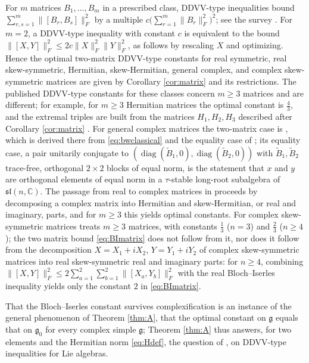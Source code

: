 \documentclass[leqno,10pt]{amsart}
\theoremstyle{definition}
\numberwithin{equation}{section}
\newcommand{\sll}{\mathfrak{sl}}
\newcommand{\g}{\mathfrak{g}}
\newcommand{\com}{\mathbb C}
\newcommand{\gz}{\g_{0}}
\newcommand{\fnorm}[1]{\lVert #1\rVert_{F}}
\begin{document}
For $m$ matrices $B_{1}, \dots, B_{m}$ in a prescribed class, DDVV-type inequalities bound $\sum_{r, s = 1}^{m}\fnorm{[B_{r}, B_{s}]}^{2}$ by a multiple $c\big(\sum_{r=1}^{m}\fnorm{B_{r}}^{2}\big)^{2}$; see the survey \cite{Ge-Li-Tang-Zhou-survey}. For $m = 2$, a DDVV-type inequality with constant $c$ is equivalent to the bound $\fnorm{[X, Y]}^{2} \leq 2c\fnorm{X}^{2}\fnorm{Y}^{2}$, as follows by rescaling $X$ and optimizing. Hence the optimal two-matrix DDVV-type constants for real symmetric, real skew-symmetric, Hermitian, skew-Hermitian, general complex, and complex skew-symmetric matrices are given by Corollary \ref{cor:matrix} and its restrictions. The published DDVV-type constants for these classes \cite{Ge, Ge-Xu-You-Zhou, Ge-Li-Zhou} concern $m \geq 3$ matrices and are different; for example, for $m \geq 3$ Hermitian matrices the optimal constant is $\tfrac{4}{3}$, and the extremal triples are built from the matrices $H_{1}, H_{2}, H_{3}$ described after Corollary \ref{cor:matrix} \cite[Theorem 1.1]{Ge-Xu-You-Zhou}. For general complex matrices the two-matrix case is \cite[Theorem 2.3(2)]{Ge-Li-Zhou}, which is derived there from \eqref{eq:bwclassical} and the equality case of \cite{Cheng-Vong-Wenzel}; its equality case, a pair unitarily conjugate to $(\operatorname{diag}(\tilde{B}_{1}, 0), \operatorname{diag}(\tilde{B}_{2}, 0))$ with $\tilde{B}_{1}, \tilde{B}_{2}$ trace-free, orthogonal $2 \times 2$ blocks of equal norm, is the statement that $x$ and $y$ are orthogonal elements of equal norm in a $\tau$-stable long-root subalgebra of $\sll(n, \com)$. The passage from real to complex matrices in \cite{Ge-Li-Zhou} proceeds by decomposing a complex matrix into Hermitian and skew-Hermitian, or real and imaginary, parts, and for $m \geq 3$ this yields optimal constants. For complex skew-symmetric matrices \cite[Corollary 2.6]{Ge-Li-Zhou} treats $m \geq 3$ matrices, with constants $\tfrac{1}{3}$ ($n = 3$) and $\tfrac{2}{3}$ ($n \geq 4$); the two matrix bound \eqref{eq:BImatrix} does not follow from it, nor does it follow from the decomposition $X = X_{1} + iX_{2}$, $Y = Y_{1} + iY_{2}$ of complex skew-symmetric matrices into real skew-symmetric real and imaginary parts: for $n \geq 4$, combining $\fnorm{[X, Y]}^{2} \leq 2\sum_{a=1}^{2}\sum_{b=1}^{2}\fnorm{[X_{a}, Y_{b}]}^{2}$ with the real Bloch--Iserles inequality yields only the constant $2$ in \eqref{eq:BImatrix}. 

That the Bloch--Iserles constant survives complexification is an instance of the general phenomenon of Theorem \ref{thm:A}, that the optimal constant on $\g$ equals that on $\gz$ for every complex simple $\g$; Theorem \ref{thm:A} thus answers, for two elements and the Hermitian norm \eqref{eq:Hdef}, the question of \cite[Section 1, question (2)]{Ge-Li-Zhou}, \cite[Question 4.2]{Ge-Li-Tang-Zhou-survey} on DDVV-type inequalities for Lie algebras.
\end{document}
